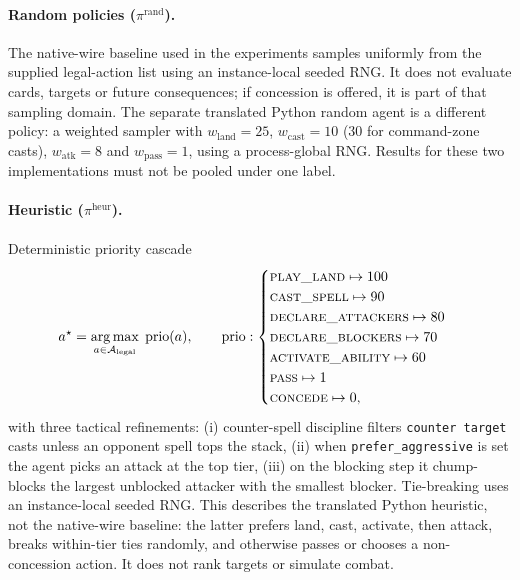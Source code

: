 \documentclass[11pt,a4paper]{article}
\theoremstyle{definition}
\theoremstyle{plain}
\DeclareMathOperator*{\argmax}{arg\,max}
\begin{document}
\paragraph{Random policies ($\pi^{\mathrm{rand}}$).}
The native-wire baseline used in the experiments samples uniformly from the
supplied legal-action list using an instance-local seeded RNG. It does not
evaluate cards, targets or future consequences; if concession is offered,
it is part of that sampling domain. The separate translated Python random
agent is a different policy: a weighted sampler with
$w_{\mathrm{land}}=25$, $w_{\mathrm{cast}}=10$ (30 for command-zone casts),
$w_{\mathrm{atk}}=8$ and $w_{\mathrm{pass}}=1$, using a process-global RNG.
Results for these two implementations must not be pooled under one label.

\paragraph{Heuristic ($\pi^{\mathrm{heur}}$).} Deterministic priority cascade
\begin{equation*}
a^\star = \argmax_{a \in \mathcal{A}_{\mathrm{legal}}} \; \mathrm{prio}(a),
\qquad
\mathrm{prio}: \begin{cases}
  \textsc{play\_land} \mapsto 100 \\
  \textsc{cast\_spell} \mapsto 90 \\
  \textsc{declare\_attackers} \mapsto 80 \\
  \textsc{declare\_blockers} \mapsto 70 \\
  \textsc{activate\_ability} \mapsto 60 \\
  \textsc{pass} \mapsto 1 \\
  \textsc{concede} \mapsto 0,
\end{cases}
\end{equation*}
with three tactical refinements: (i) counter-spell discipline filters \texttt{counter target} casts unless an opponent spell tops the stack, (ii) when \texttt{prefer\_aggressive} is set the agent picks an attack at the top tier, (iii) on the blocking step it chump-blocks the largest unblocked attacker with the smallest blocker. Tie-breaking uses an instance-local seeded RNG. This describes the translated Python heuristic, not the native-wire baseline: the latter prefers land, cast, activate, then attack, breaks within-tier ties randomly, and otherwise passes or chooses a non-concession action. It does not rank targets or simulate combat.
\end{document}
